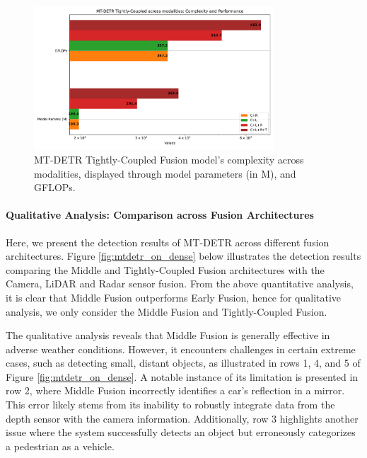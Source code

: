 \documentclass[report.tex]{subfiles}
\begin{document}
    \begin{figure}[h!]
        \centering
        \includegraphics[width=0.8\textwidth]{images/results/mtdetr/T_CLRT/model_complexity.pdf}
        \caption{MT-DETR Tightly-Coupled Fusion model's complexity across modalities, displayed through model parameters (in M), and GFLOPs.}
        \label{fig:mtdetr_t_clrt_model_complexity}
    \end{figure}

    \paragraph*{Qualitative Analysis: Comparison across Fusion Architectures}

    Here, we present the detection results of MT-DETR across different fusion architectures. Figure \ref{fig:mtdetr_on_dense} below illustrates the detection results comparing the Middle and Tightly-Coupled Fusion architectures with the Camera, LiDAR and Radar sensor fusion. From the above quantitative analysis, it is clear that Middle Fusion outperforms Early Fusion, hence for qualitative analysis, we only consider the Middle Fusion and Tightly-Coupled Fusion.

    The qualitative analysis reveals that Middle Fusion is generally effective in adverse weather conditions. However, it encounters challenges in certain extreme cases, such as detecting small, distant objects, as illustrated in rows 1, 4, and 5 of Figure \ref{fig:mtdetr_on_dense}. A notable instance of its limitation is presented in row 2, where Middle Fusion incorrectly identifies a car's reflection in a mirror. This error likely stems from its inability to robustly integrate data from the depth sensor with the camera information. Additionally, row 3 highlights another issue where the system successfully detects an object but erroneously categorizes a pedestrian as a vehicle.
\end{document}

